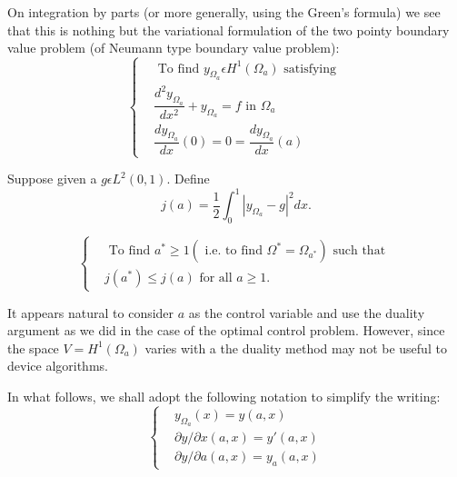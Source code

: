 On integration by parts (or more generally, using the Green's formula) we see that this is nothing but the variational formulation of the two pointy boundary value problem (of Neumann type boundary value problem):
\begin{equation*}
\begin{cases}
& \text{ To find } y_{\Omega_{a}} \epsilon H^{1} (\Omega_{a}) \text{ satisfying }\\
& \dfrac{d^{2} y_{\Omega_{a}}}{dx^{2}} + y_{\Omega_{a}} = f \text{ in } \Omega_{a}\\
& \dfrac{dy_{\Omega_{a}}}{dx} (0) = 0 = \dfrac{dy_{\Omega_{a}}}{dx} (a)\tag*{$(2.16)'$}\label{chap6-eq2.16'}
\end{cases}
\end{equation*}\pageoriginale

\medskip
{} Suppose given a $g \epsilon L^{2} (0, 1)$. Define
\begin{equation*}
j(a) = \frac{1}{2} \int_{0}^{1} |y_{\Omega_{a}} - g|^{2} dx.\tag{2.17}\label{chap6-eq2.17}
\end{equation*}

\medskip
{}
\begin{equation*}
\begin{cases}
& \text{ To find } a^{*} \geq 1 (\text{ i.e. to find } \Omega^{*} = \Omega_{a^{*}}) \text{ such that }\\
& j(a^{*}) \leq j(a) \text{ for all } a \geq 1. \tag{2.18}\label{chap6-eq2.18}
\end{cases}
\end{equation*}

\begin{remark}\label{chap6-rem2.1}
It appears natural to consider $a$ as the control variable and use the
duality argument as we did in the case of the optimal control
problem. However, since the space $V = H^{1} (\Omega_{a})$ varies with
a the duality method may not be useful to device algorithms. 
\end{remark}

In what follows, we shall adopt the following notation to simplify the writing:
\begin{equation*}
\begin{cases}
& y_{\Omega_{a}} (x) = y(a, x)\\
& \partial y / \partial x (a, x) = y'(a, x)\\
& \partial y / \partial a (a, x) = y_{a} (a, x)\tag{2.19}\label{chap6-eq2.19}
\end{cases}
\end{equation*}

